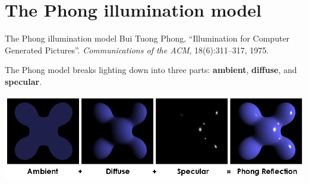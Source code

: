 \part{The Phong illumination model}
\frame{\partpage}

\begin{frame}{The Phong illumination model}
	\pause Bui Tuong Phong,
	``Illumination for Computer Generated Pictures''.
	\textit{Communications of the ACM},
	18(6):311--317,
	1975.
	
	\pause The Phong model breaks lighting down into three parts:
		\textbf{ambient}, \textbf{diffuse}, and \textbf{specular}.
		
	\pause\includegraphics[width=\textwidth]{phong}
\end{frame}

